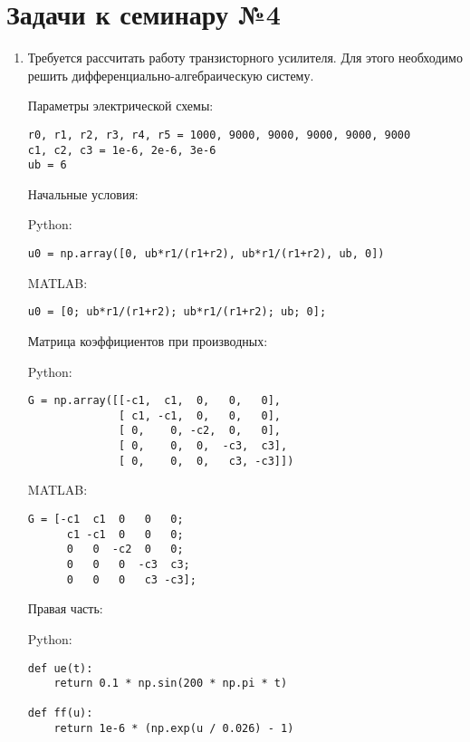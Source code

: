 \section*{Задачи к семинару №4}
\begin{enumerate}
\item Требуется рассчитать работу транзисторного усилителя. Для этого необходимо решить дифференциально-алгебраическую систему.

Параметры электрической схемы:
\begin{verbatim}
r0, r1, r2, r3, r4, r5 = 1000, 9000, 9000, 9000, 9000, 9000
c1, c2, c3 = 1e-6, 2e-6, 3e-6
ub = 6
\end{verbatim}
Начальные условия:

Python:
\begin{verbatim}
u0 = np.array([0, ub*r1/(r1+r2), ub*r1/(r1+r2), ub, 0])
\end{verbatim}
MATLAB:
\begin{matlablisting}
	\begin{verbatim}
u0 = [0; ub*r1/(r1+r2); ub*r1/(r1+r2); ub; 0];
	\end{verbatim}
\end{matlablisting}
Матрица коэффициентов при производных:  

Python:
\begin{verbatim}
G = np.array([[-c1,  c1,  0,   0,   0],
              [ c1, -c1,  0,   0,   0],
              [ 0,    0, -c2,  0,   0],
              [ 0,    0,  0,  -c3,  c3],
              [ 0,    0,  0,   c3, -c3]])
\end{verbatim}
MATLAB:
\begin{matlablisting}
	\begin{verbatim}
G = [-c1  c1  0   0   0;
      c1 -c1  0   0   0;
      0   0  -c2  0   0;
      0   0   0  -c3  c3;
      0   0   0   c3 -c3];
	\end{verbatim}
\end{matlablisting}
\newpage
Правая часть:

Python:
\begin{verbatim}
def ue(t):
    return 0.1 * np.sin(200 * np.pi * t)

def ff(u):
    return 1e-6 * (np.exp(u / 0.026) - 1)


\end{verbatim}
\end{enumerate}
